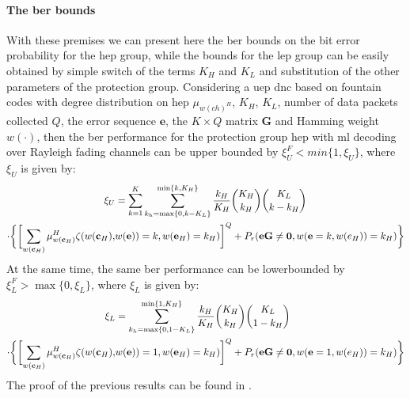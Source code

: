 \paragraph{The \gls{ber} bounds}
With these premises we can present here the \gls{ber} bounds on the bit error probability for the \gls{hep} group, while the bounds for the \gls{lep} group can be easily obtained by simple switch of the terms $K_H$ and $K_L$ and substitution of the other parameters of the protection group. Considering a \gls{uep} \gls{dnc} based on fountain codes with degree distribution on \gls{hep} $\mu_{w(ch)^H}$, $K_H$, $K_L$, number of data packets collected $Q$, the error sequence $\mathbf{e}$, the $K\times Q$ matrix $\mathbf{G}$ and Hamming weight $w(\cdot)$, then the \gls{ber} performance for the protection group \gls{hep} with \gls{ml} decoding over Rayleigh fading channels can be upper bounded by $\xi_U^F < min\{1,\xi_U\}$, where $\xi_U$ is given by:
\begin{align}
\centering
  \xi_U & = \sum_{k=1}^K\sum_{k_h = \max\{0,k-K_L\}}^{\min\{k,K_H\}}\frac{k_H}{K_H}\binom{K_H}{k_H}\binom{K_L}{k - k_H}\\
   \cdot\biggl\{\biggl[\sum_{w(\mathbf{c}_H)}\mu_{w(\mathbf{c}_H)}^H\zeta(w(\mathbf{c}_H),&w(\mathbf{e})) = k,w(\mathbf{e}_H) = k_H)\biggr]^Q+P_r(\mathbf{eG} \neq \mathbf{0},w(\mathbf{e} = k, w(e_H)) = k_H)\biggr\}
\end{align}
At the same time, the same \gls{ber} performance can be lowerbounded by $\xi_L^F > \max\{0,\xi_L\}$, where $\xi_L$ is given by:
\begin{align}
\centering
  \xi_L & = \sum_{k_h = \max\{0,1-K_L\}}^{\min\{1,K_H\}}\frac{k_H}{K_H}\binom{K_H}{k_H}\binom{K_L}{1 - k_H}\\
   \cdot\biggl\{\biggl[\sum_{w(\mathbf{c}_H)}\mu_{w(\mathbf{c}_H)}^H\zeta(w(\mathbf{c}_H),&w(\mathbf{e})) = 1,w(\mathbf{e}_H) = k_H)\biggr]^Q+P_r(\mathbf{eG} \neq \mathbf{0},w(\mathbf{e} = 1, w(e_H)) = k_H)\biggr\}
\end{align}
The proof of the previous results can be found in \cite{Yue2014}.

